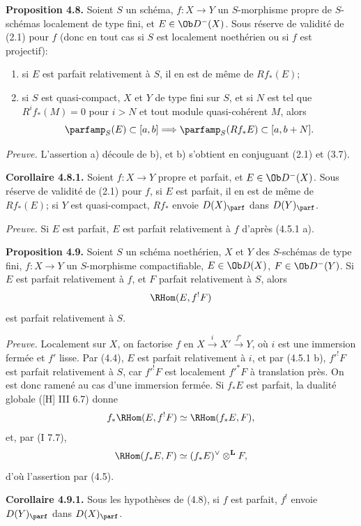 \documentclass[11pt]{article}
\begin{document}
\textbf{Proposition 4.8.} Soient \(S\) un schéma, \(f:X\to Y\) un \(S\)-morphisme propre de \(S\)-schémas localement de type fini, et \(E\in\Ob D^{-}(X)\). Sous réserve de validité de (2.1) pour \(f\) (donc en tout cas si \(S\) est localement noethérien ou si \(f\) est projectif):
\begin{enumerate}[label=\alph*)]
\item si \(E\) est parfait relativement à \(S\), il en est de même de \(Rf_*(E)\);
\item si \(S\) est quasi-compact, \(X\) et \(Y\) de type fini sur \(S\), et si \(N\) est tel que \(R^if_*(M)=0\) pour \(i>N\) et tout module quasi-cohérent \(M\), alors
\[
 \parfamp_S(E)\subset[a,b]
 \Longrightarrow
 \parfamp_S(Rf_*E)
 \subset[a,b+N].
\]
\end{enumerate}

\emph{Preuve.} L'assertion a) découle de b), et b) s'obtient en conjuguant (2.1) et (3.7).

\textbf{Corollaire 4.8.1.} Soient \(f:X\to Y\) propre et parfait, et \(E\in\Ob D^{-}(X)\). Sous réserve de validité de (2.1) pour \(f\), si \(E\) est parfait, il en est de même de \(Rf_*(E)\); si \(Y\) est quasi-compact, \(Rf_*\) envoie \(D(X)_{\parf}\) dans \(D(Y)_{\parf}\).

\emph{Preuve.} Si \(E\) est parfait, \(E\) est parfait relativement à \(f\) d'après (4.5.1 a).

\textbf{Proposition 4.9.} Soient \(S\) un schéma noethérien, \(X\) et \(Y\) des \(S\)-schémas de type fini, \(f:X\to Y\) un \(S\)-morphisme compactifiable, \(E\in\Ob D(X)\), \(F\in\Ob D^{-}(Y)\). Si \(E\) est parfait relativement à \(f\), et \(F\) parfait relativement à \(S\), alors
\[
 \RHom(E,f^!F)
\]
est parfait relativement à \(S\).

\emph{Preuve.} Localement sur \(X\), on factorise \(f\) en \(X\xrightarrow{i}X'\xrightarrow{f'}Y\), où \(i\) est une immersion fermée et \(f'\) lisse. Par (4.4), \(E\) est parfait relativement à \(i\), et par (4.5.1 b), \(f'^!F\) est parfait relativement à \(S\), car \(f'^!F\) est localement \(f'^*F\) à translation près. On est donc ramené au cas d'une immersion fermée. Si \(f_*E\) est parfait, la dualité globale ([H] III 6.7) donne
\[
 f_*\RHom(E,f^!F)
 \simeq \RHom(f_*E,F),
\]
et, par (I 7.7),
\[
 \RHom(f_*E,F)
 \simeq (f_*E)^{\vee}\otimes^{\mathbf L}F,
\]
d'où l'assertion par (4.5).

\textbf{Corollaire 4.9.1.} Sous les hypothèses de (4.8), si \(f\) est parfait, \(f^!\) envoie \(D(Y)_{\parf}\) dans \(D(X)_{\parf}\).
\end{document}
